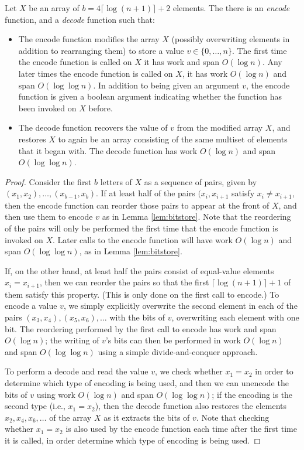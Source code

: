 \documentclass[twoside,leqno,twocolumn]{article}
\begin{document}
\begin{lemma}
Let $X$ be an array of $b = 4 \lceil \log (n + 1) \rceil + 2$
elements. The there is an \emph{encode} function, and a \emph{decode}
function such that:
\begin{itemize}
\item The encode function modifies the array $X$ (possibly overwriting
  elements in addition to rearranging them) to store a value $v \in
  \{0, \ldots, n\}$. The first time the encode function is called on
  $X$ it has work and span $O(\log n)$. Any later times the encode
  function is called on $X$, it has work $O(\log n)$ and span $O(\log
  \log n)$. In addition to being given an argument $v$, the encode
  function is given a boolean argument indicating whether the function
  has been invoked on $X$ before.
\item The decode function recovers the value of $v$ from the modified
  array $X$, and restores $X$ to again be an array consisting of the
  same multiset of elements that it began with. The decode function
  has work $O(\log n)$ and span $O(\log \log n)$.
\end{itemize}
  \label{lem:bitstore2}
\end{lemma}
\begin{proof}
Consider the first $b$ letters of $X$ as a sequence of pairs, given by
$(x_1, x_2), \ldots, (x_{b - 1}, x_b)$. If at least half of the pairs
$(x_i, x_{i + 1}$ satisfy $x_i \neq x_{i + 1}$, then the encode
function can reorder those pairs to appear at the front of $X$, and
then use them to encode $v$ as in Lemma \ref{lem:bitstore}. Note that
the reordering of the pairs will only be performed the first time that
the encode function is invoked on $X$. Later calls to the encode
function will have work $O(\log n)$ and span $O(\log \log n)$, as in
Lemma \ref{lem:bitstore}.

If, on the other hand, at least half the pairs consist of equal-value
elements $x_i = x_{i + 1}$, then we can reorder the pairs so that the
first $\lceil \log (n + 1) \rceil + 1$ of them satisfy this
property. (This is only done on the first call to encode.) To encode a
value $v$, we simply explicitly overwrite the second element in each
of the pairs $(x_3, x_4), (x_5, x_6), \ldots$ with the bits of $v$,
overwriting each element with one bit. The reordering performed by the
first call to encode has work and span $O(\log n)$; the writing of
$v$'s bits can then be performed in work $O(\log n)$ and span $O(\log
\log n)$ using a simple divide-and-conquer approach.

To perform a decode and read the value $v$, we check whether $x_1 =
x_2$ in order to determine which type of encoding is being used, and
then we can unencode the bits of $v$ using work $O(\log n)$ and span
$O(\log \log n)$; if the encoding is the second type (i.e., $x_1 =
x_2$), then the decode function also restores the elements $x_2, x_4,
x_6, \ldots$ of the array $X$ as it extracts the bits of $v$. Note
that checking whether $x_1 = x_2$ is also used by the encode function
each time after the first time it is called, in order determine which
type of encoding is being used.
\end{proof}
\end{document}
